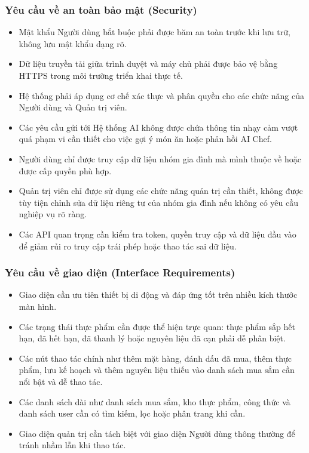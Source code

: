 \documentclass[../main.tex]{subfiles}
\begin{document}
\subsubsection{Yêu cầu về an toàn bảo mật (Security)}
\begin{itemize}
    \item Mật khẩu Người dùng bắt buộc phải được băm an toàn trước khi lưu trữ, không lưu mật khẩu dạng rõ.
    \item Dữ liệu truyền tải giữa trình duyệt và máy chủ phải được bảo vệ bằng HTTPS trong môi trường triển khai thực tế.
    \item Hệ thống phải áp dụng cơ chế xác thực và phân quyền cho các chức năng của Người dùng và Quản trị viên.
    \item Các yêu cầu gửi tới Hệ thống AI không được chứa thông tin nhạy cảm vượt quá phạm vi cần thiết cho việc gợi ý món ăn hoặc phản hồi AI Chef.
    \item Người dùng chỉ được truy cập dữ liệu nhóm gia đình mà mình thuộc về hoặc được cấp quyền phù hợp.
    \item Quản trị viên chỉ được sử dụng các chức năng quản trị cần thiết, không được tùy tiện chỉnh sửa dữ liệu riêng tư của nhóm gia đình nếu không có yêu cầu nghiệp vụ rõ ràng.
    \item Các API quan trọng cần kiểm tra token, quyền truy cập và dữ liệu đầu vào để giảm rủi ro truy cập trái phép hoặc thao tác sai dữ liệu.
\end{itemize}

\subsubsection{Yêu cầu về giao diện (Interface Requirements)}
\begin{itemize}
    \item Giao diện cần ưu tiên thiết bị di động và đáp ứng tốt trên nhiều kích thước màn hình.
    \item Các trạng thái thực phẩm cần được thể hiện trực quan: thực phẩm sắp hết hạn, đã hết hạn, đã thanh lý hoặc nguyên liệu đã cạn phải dễ phân biệt.
    \item Các nút thao tác chính như thêm mặt hàng, đánh dấu đã mua, thêm thực phẩm, lưu kế hoạch và thêm nguyên liệu thiếu vào danh sách mua sắm cần nổi bật và dễ thao tác.
    \item Các danh sách dài như danh sách mua sắm, kho thực phẩm, công thức và danh sách user cần có tìm kiếm, lọc hoặc phân trang khi cần.
    \item Giao diện quản trị cần tách biệt với giao diện Người dùng thông thường để tránh nhầm lẫn khi thao tác.
\end{itemize}
\end{document}
